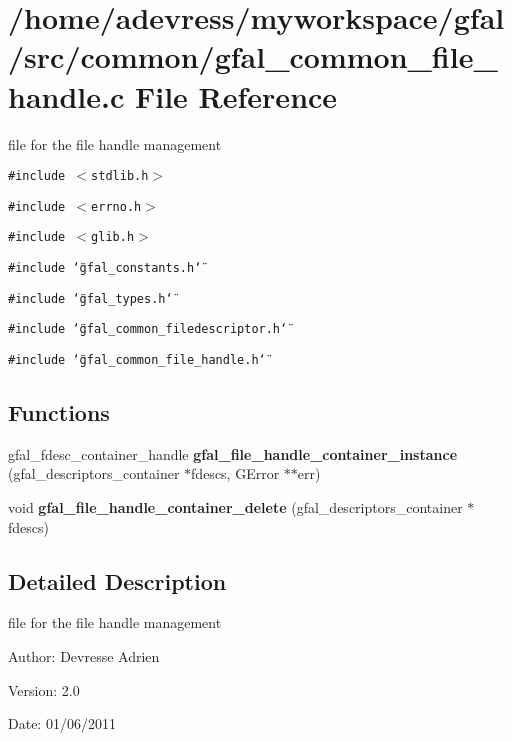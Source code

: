 \section{/home/adevress/myworkspace/gfal/src/common/gfal\_\-common\_\-file\_\-handle.c File Reference}
\label{gfal__common__file__handle_8c}
file for the file handle management 

{\tt \#include $<$stdlib.h$>$}\par
{\tt \#include $<$errno.h$>$}\par
{\tt \#include $<$glib.h$>$}\par
{\tt \#include \char`\"{}gfal\_\-constants.h\char`\"{}}\par
{\tt \#include \char`\"{}gfal\_\-types.h\char`\"{}}\par
{\tt \#include \char`\"{}gfal\_\-common\_\-filedescriptor.h\char`\"{}}\par
{\tt \#include \char`\"{}gfal\_\-common\_\-file\_\-handle.h\char`\"{}}\par
\subsection*{Functions}
\begin{CompactItemize}
\item 
gfal\_\-fdesc\_\-container\_\-handle \textbf{gfal\_\-file\_\-handle\_\-container\_\-instance} (gfal\_\-descriptors\_\-container $\ast$fdescs, GError $\ast$$\ast$err)\label{gfal__common__file__handle_8c_38d580e0e1bd4b15a3473d731fb94ca0}

\item 
void \textbf{gfal\_\-file\_\-handle\_\-container\_\-delete} (gfal\_\-descriptors\_\-container $\ast$fdescs)\label{gfal__common__file__handle_8c_a0951d6d30a9ea82a6d5c84cd29092d5}

\end{CompactItemize}


\subsection{Detailed Description}
file for the file handle management 

\begin{Desc}
\item[Author:]Devresse Adrien \end{Desc}
\begin{Desc}
\item[Version:]2.0 \end{Desc}
\begin{Desc}
\item[Date:]01/06/2011 \end{Desc}
